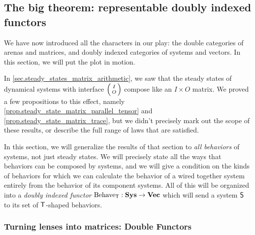 \documentclass[DynamicalBook]{subfiles}
\begin{document}
\subsection{The big theorem: representable doubly indexed functors}

We have now introduced all the characters in our play: the double categories of
arenas and matrices, and doubly indexed categories of systems and vectors. In
this section, we will put the plot in motion. 

In \cref{sec.steady_states_matrix_arithmetic}, we saw that the steady states of
dynamical systems with interface $\lens{I}{O}$ compose like an $I \times O$
matrix. We proved a few propositions to this effect, namely
\cref{prop.steady_state_matrix_parallel_tensor} and
\cref{prop.steady_state_matrix_trace}, but we didn't precisely mark out the
scope of these results, or describe the full range of laws that are satisfied.

In this section, we will generalize the results of that section to \emph{all
  behaviors} of systems, not just steady states. We will precisely state all the
ways that behaviors can be composed by systems, and we will give a condition on
the kinds of behaviors for which we can calculate the behavior of a wired
together system entirely from the behavior of its component systems. All of this will be organized into a \emph{doubly indexed functor}
$\mathrm{Behave}_{\mathsf{T}} : \textbf{Sys} \to \textbf{Vec}$
which will send a system $\mathsf{S}$ to its set of
$\mathsf{T}$-shaped behaviors. 


\subsubsection{Turning lenses into matrices: Double Functors}
\end{document}
